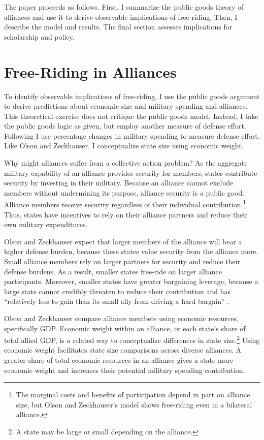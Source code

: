 \documentclass[12pt]{article}
\begin{document}
The paper proceeds as follows.
First, I summarize the public goods theory of alliances and use it to derive observable implications of free-riding.
Then, I describe the model and results. 
The final section assesses implications for scholarship and policy. 



\section{Free-Riding in Alliances}

To identify observable implications of free-riding, I use the public goods argument to derive predictions about economic size and military spending and alliances.
This theoretical exercise does not critique the public goods model.
Instead, I take the public goods logic as given, but employ another measure of defense effort. 
Following \citet{PluemperNeumayer2015} I use percentage changes in military spending to measure defense effort.
Like Olson and Zeckhauser, I conceptualize state size using economic weight. 


Why might alliances suffer from a collective action problem?
As the aggregate military capability of an alliance provides security for members, states contribute security by investing in their military.
Because an alliance cannot exclude members without undermining its purpose, alliance security is a public good. 
Alliance members receive security regardless of their individual contribution.\footnote{The marginal costs and benefits of participation depend in part on alliance size, but Olson and Zeckhauser's model shows free-riding even in a bilateral alliance.}
Thus, states have incentives to rely on their alliance partners and reduce their own military expenditures.  

 
Olson and Zeckhauser expect that larger members of the alliance will bear a higher defense burden, because these states value security from the alliance more.
Small alliance members rely on larger partners for security and reduce their defense burdens.
As a result, smaller states free-ride on larger alliance participants. 
Moreover, smaller states have greater bargaining leverage, because a large state cannot credibly threaten to reduce their contribution and has ``relatively less to gain than its small ally from driving a hard bargain'' \citep[pg. 274]{OlsonZeckhauser1966}. 


Olson and Zeckhauser compare alliance members using economic resources, specifically GDP.
Economic weight within an alliance, or each state's share of total allied GDP, is a related way to conceptualize differences in state size.\footnote{A state may be large or small depending on the alliance.} 
Using economic weight facilitates state size comparisons across diverse alliances. 
A greater share of total economic resources in an alliance gives a state more economic weight and increases their potential military spending contribution. 
\end{document}
